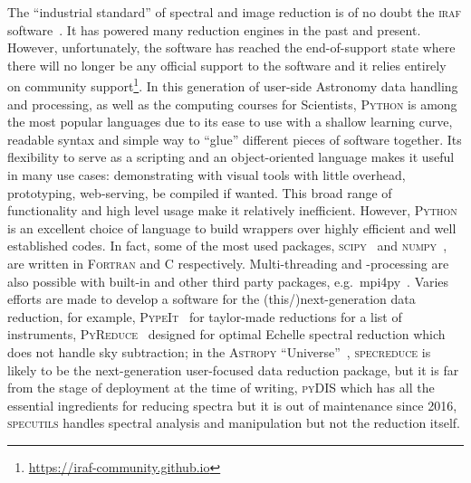 \documentclass[fleqn,usenatbib]{mnras}
\begin{document}
The ``industrial standard'' of spectral and image reduction is of no doubt the
\textsc{iraf} software~\citep{1986SPIE..627..733T, 1993ASPC...52..173T}. It has powered many
reduction engines in the past and present. However, unfortunately, the software has reached
the end-of-support state where there will no longer be any official support to the software
and it relies entirely on community support\footnote{\url{https://iraf-community.github.io}}.
In this generation of user-side Astronomy data handling and processing, as well as the
computing courses for Scientists, \textsc{Python} is among the most popular languages due to
its ease to use with a shallow learning curve, readable syntax and simple way to ``glue''
different pieces of software together. Its flexibility to serve as a scripting and an
object-oriented language makes it useful in many use cases: demonstrating with visual tools
with little overhead, prototyping, web-serving, be compiled if wanted. This broad range of
functionality and high level usage make it relatively inefficient. However, \textsc{Python}
is an excellent choice of language to build wrappers over highly efficient and well
established codes. In fact, some of the most used packages,
\textsc{scipy}~\citep{2020SciPy-NMeth} and \textsc{numpy}~\citep{2020NumPy-Array},
are written in \textsc{Fortran} and \textsc{C} respectively. Multi-threading and -processing
are also possible with built-in and other third party packages, e.g.\ mpi4py~\citep{DALCIN20111124}. 
Varies efforts are made to develop a software for the (this/)next-generation data reduction,
for example, \textsc{PypeIt}~\citep{pypeit:zenodo, pypeit:joss_pub} for taylor-made reductions
for a list of instruments, \textsc{PyReduce}~\citep{2021A&A...646A..32P} designed for optimal
Echelle spectral reduction which does not handle sky subtraction;
in the \textsc{Astropy} ``Universe''~\citep{astropy:2013, astropy:2018}, \textsc{specreduce}
is likely to be the next-generation user-focused data reduction package, but it is far from
the stage of deployment at the time of writing, \textsc{pyDIS} which has all the essential
ingredients for reducing spectra but it is out of maintenance since 2016, \textsc{specutils}
handles spectral analysis and manipulation but not the reduction itself.
\end{document}
